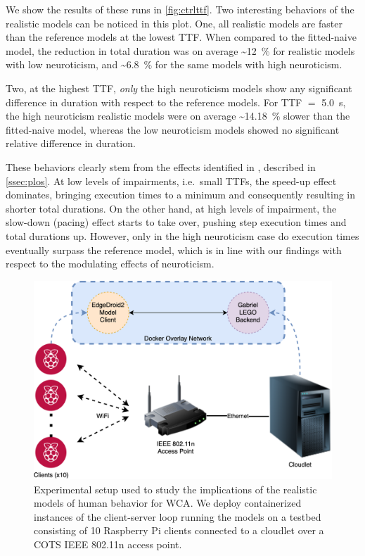 We show the results of these runs in \cref{fig:ctrlttf}.
Two interesting behaviors of the realistic models can be noticed in this plot.
One, all realistic models are faster than the reference models at the lowest \ac{TTF}.
When compared to the fitted-naive model, the reduction in total duration was on average \textasciitilde\SI{12}{\percent} for realistic models with low neuroticism, and \textasciitilde\SI{6.8}{\percent} for the same models with high neuroticism.

Two, at the highest \ac{TTF}, \emph{only} the high neuroticism models show any significant difference in duration with respect to the reference models.
For \ac{TTF} \(=\) \SI{5.0}{s}, the high neuroticism realistic models were on average \textasciitilde\SI{14.18}{\percent} slower than the fitted-naive model, whereas the low neuroticism models showed no significant relative difference in duration.

These behaviors clearly stem from the effects identified in \textcite{olguinmunoz:impact2021}, described in \cref{ssec:plos}.
At low levels of impairments, i.e.\ small \acp{TTF}, the speed-up effect dominates, bringing execution times to a minimum and consequently resulting in shorter total durations.
On the other hand, at high levels of impairment, the slow-down (pacing) effect starts to take over, pushing step execution times and total durations up.
However, only in the high neuroticism case do execution times eventually surpass the reference model, which is in line with our findings with respect to the modulating effects of neuroticism.

\medskip

\begin{figure}
    \centering
    \includegraphics[width=\columnwidth]{figs/EdgeDroid2ExperimentalSetup.png}
    \caption{%
        Experimental setup used to study the implications of the realistic models of human behavior for \ac{WCA}.
        We deploy containerized instances of the client-server loop running the models on a testbed consisting of \num{10} Raspberry Pi clients connected to a cloudlet over a \ac{COTS} \acs{IEEE} \num{802.11}n access point.
    }\label{fig:expsetup}
\end{figure}

